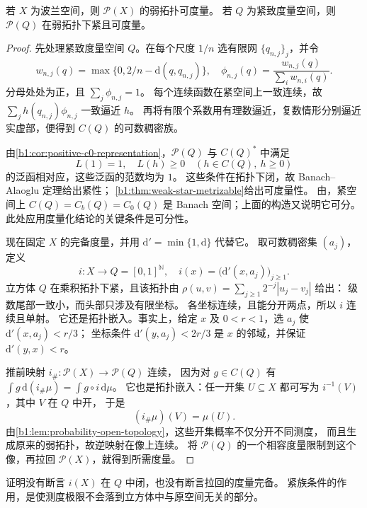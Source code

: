 \begin{lemma}\label{b1:lem:probability-weak-metrizable}
若 \(X\) 为波兰空间，则 \(\mathcal P(X)\) 的弱拓扑可度量。
若 \(Q\) 为紧致度量空间，则 \(\mathcal P(Q)\) 在弱拓扑下紧且可度量。
\end{lemma}
\begin{proof}
先处理紧致度量空间 \(Q\)。在每个尺度 \(1/n\) 选有限网 \(\{q_{n,j}\}_j\)，并令
\[
 w_{n,j}(q)=\max\{0,2/n-\mathrm{d}(q,q_{n,j})\},
 \quad
 \phi_{n,j}(q)=\frac{w_{n,j}(q)}{\sum_iw_{n,i}(q)}.
\]
分母处处为正，且 \(\sum_j\phi_{n,j}=1\)。
每个连续函数在紧空间上一致连续，故
\(\sum_jh(q_{n,j})\phi_{n,j}\) 一致逼近 \(h\)。
再将有限个系数用有理数逼近，复数情形分别逼近实虚部，便得到 \(C(Q)\) 的可数稠密族。

由\cref{b1:cor:positive-c0-representation}，\(\mathcal P(Q)\) 与 \(C(Q)^*\) 中满足
\[
 L(1)=1,\quad L(h)\geq0\quad(h\in C(Q),\ h\geq0)
\]
的泛函相对应，这些泛函的范数均为 \(1\)。
这些条件在\WeakStar{}拓扑下闭，故 Banach--Alaoglu 定理给出紧性；
\cref{b1:thm:weak-star-metrizable}给出可度量性。
由，紧空间上
\(C(Q)=C_b(Q)=C_0(Q)\) 是 Banach 空间；上面的构造又说明它可分。
此处应用\WeakStar{}度量化结论的关键条件是可分性。

现在固定 \(X\) 的完备度量，并用 \(\mathrm{d}'=\min\{1,\mathrm{d}\}\) 代替它。
取可数稠密集 \((a_j)\)，定义
\[
 i:X\longrightarrow Q=[0,1]^{\mathbb N},
 \quad i(x)=\bigl(\mathrm{d}'(x,a_j)\bigr)_{j\geq1}.
\]
立方体 \(Q\) 在乘积拓扑下紧，且该拓扑由
\(\rho(u,v)=\sum_{j\geq1}2^{-j}|u_j-v_j|\) 给出：
级数尾部一致小，而头部只涉及有限坐标。
各坐标连续，且能分开两点，所以 \(i\) 连续且单射。
它还是拓扑嵌入。事实上，给定 \(x\) 及 \(0<r<1\)，选 \(a_j\) 使 \(\mathrm{d}'(x,a_j)<r/3\)；
坐标条件 \(\mathrm{d}'(y,a_j)<2r/3\) 是 \(x\) 的邻域，并保证 \(\mathrm{d}'(y,x)<r\)。

推前映射 \(i_\#:\mathcal P(X)\rightarrow\mathcal P(Q)\) 连续，
因为对 \(g\in C(Q)\) 有 \(\int g\,\mathrm{d}(i_\#\mu)=\int g\circ i\,\mathrm{d}\mu\)。
它也是拓扑嵌入：任一开集 \(U\subseteq X\) 都可写为 \(i^{-1}(V)\)，其中 \(V\) 在 \(Q\) 中开，
于是
\[
 (i_\#\mu)(V)=\mu(U).
\]
由\cref{b1:lem:probability-open-topology}，这些开集概率不仅分开不同测度，
而且生成原来的弱拓扑，故逆映射在像上连续。
将 \(\mathcal P(Q)\) 的一个相容度量限制到这个像，再拉回 \(\mathcal P(X)\)，就得到所需度量。
\end{proof}

证明没有断言 \(i(X)\) 在 \(Q\) 中闭，也没有断言拉回的度量完备。
紧族条件的作用，是使测度极限不会落到立方体中与原空间无关的部分。


